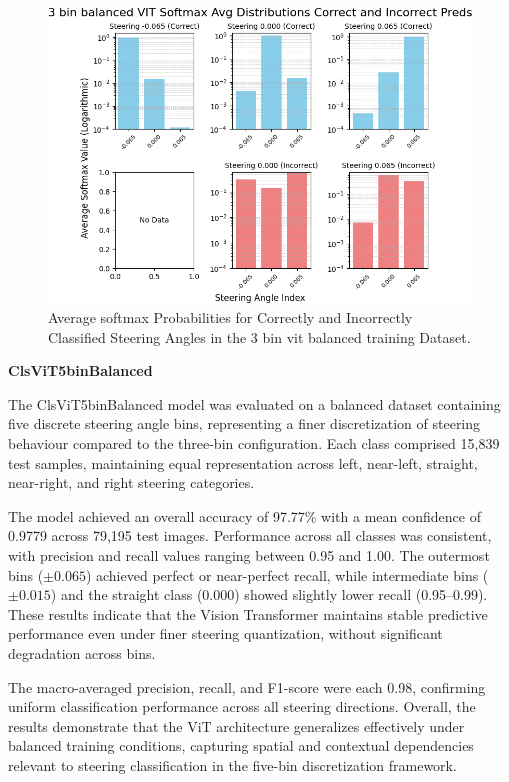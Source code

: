 \begin{figure}[H]
    \centering
    \includegraphics[width=1\linewidth]{Figures/Results/3_bins_vit_softmax_dist_plot_balanced.png}
    \caption{Average softmax Probabilities for Correctly and Incorrectly Classified Steering Angles in the 3 bin vit balanced training Dataset.}
    \label{fig:3_bins_vit_softmax_dist_balanced}
\end{figure}


\textbf{ClsViT5binBalanced}

The ClsViT5binBalanced model was evaluated on a balanced dataset containing five discrete steering angle bins, representing a finer discretization of steering behaviour compared to the three-bin configuration. Each class comprised 15,839 test samples, maintaining equal representation across left, near-left, straight, near-right, and right steering categories.

The model achieved an overall accuracy of 97.77\% with a mean confidence of 0.9779 across 79,195 test images. Performance across all classes was consistent, with precision and recall values ranging between 0.95 and 1.00. The outermost bins ($\pm0.065$) achieved perfect or near-perfect recall, while intermediate bins ($\pm0.015$) and the straight class ($0.000$) showed slightly lower recall (0.95–0.99). These results indicate that the Vision Transformer maintains stable predictive performance even under finer steering quantization, without significant degradation across bins.

The macro-averaged precision, recall, and F1-score were each 0.98, confirming uniform classification performance across all steering directions. Overall, the results demonstrate that the ViT architecture generalizes effectively under balanced training conditions, capturing spatial and contextual dependencies relevant to steering classification in the five-bin discretization framework.


